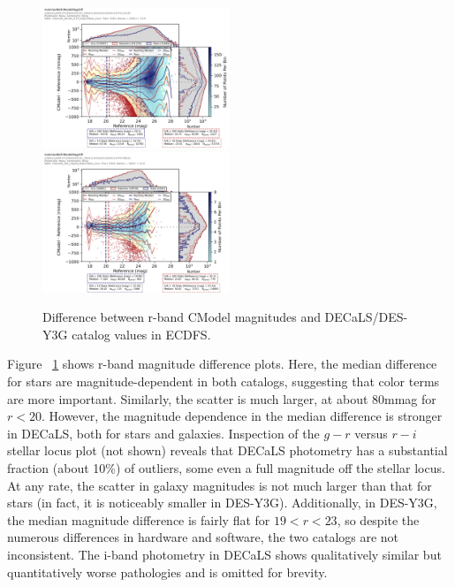 \begin{figure}
  \label{fig:cdfs_r_vs_des}
  \includegraphics[width=0.5\textwidth]{galaxy_photometry/cdfs_r_vs_DECaLS.png}
  \includegraphics[width=0.5\textwidth]{galaxy_photometry/cdfs_r_vs_desy3g.png}
\caption{Difference between r-band CModel magnitudes and DECaLS/DES-Y3G catalog values in ECDFS.}
\end{figure}

Figure ~\ref{fig:cdfs_r_vs_des} shows r-band magnitude difference plots.
Here, the median difference for stars are magnitude-dependent in both catalogs, suggesting that color terms are more important.
Similarly, the scatter is much larger, at about 80mmag for $r < 20$.
However, the magnitude dependence in the median difference is stronger in DECaLS, both for stars and galaxies.
Inspection of the $g-r$ versus $r-i$ stellar locus plot (not shown) reveals that DECaLS photometry has a substantial fraction (about 10\%) of outliers, some even a full magnitude off the stellar locus.
At any rate, the scatter in galaxy magnitudes is not much larger than that for stars (in fact, it is noticeably smaller in DES-Y3G).
Additionally, in DES-Y3G, the median magnitude difference is fairly flat for $19<r<23$, so despite the numerous differences in hardware and software, the two catalogs are not inconsistent.
The i-band photometry in DECaLS shows qualitatively similar but quantitatively worse pathologies and is omitted for brevity.

